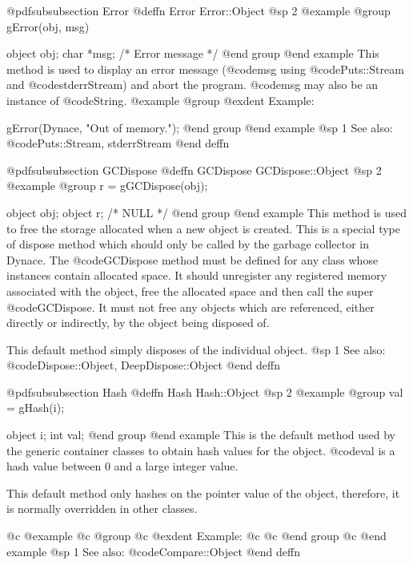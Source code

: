 @pdfsubsubsection {Error}
@deffn {Error} Error::Object
@sp 2
@example
@group
gError(obj, msg)

object  obj;
char    *msg;  /*  Error message  */
@end group
@end example
This method is used to display an error message (@code{msg} using
@code{Puts::Stream} and @code{stderrStream}) and abort the
program.  @code{msg} may also be an instance of @code{String}.
@example
@group
@exdent Example:

gError(Dynace, "Out of memory.\n");
@end group
@end example
@sp 1
See also:  @code{Puts::Stream, stderrStream}
@end deffn













@pdfsubsubsection {GCDispose}
@deffn {GCDispose} GCDispose::Object
@sp 2
@example
@group
r = gGCDispose(obj);

object  obj;
object  r;     /*  NULL  */
@end group
@end example
This method is used to free the storage allocated when a new object is
created.  This is a special type of dispose method which should only be
called by the garbage collector in Dynace.  The @code{GCDispose} method
must be defined for any class whose instances contain allocated space.
It should unregister any registered memory associated with the object,
free the allocated space and then call the super @code{GCDispose}.  It
must not free any objects which are referenced, either directly or
indirectly, by the object being disposed of.

This default method simply disposes of the individual object.
@sp 1
See also:  @code{Dispose::Object, DeepDispose::Object}
@end deffn





@pdfsubsubsection {Hash}
@deffn {Hash} Hash::Object
@sp 2
@example
@group
val = gHash(i);

object  i;
int     val;
@end group
@end example
This is the default method used by the generic container classes to
obtain hash values for the object.  @code{val} is a hash value between 0
and a large integer value.

This default method only hashes on the pointer value of the object,
therefore, it is normally overridden in other classes.

@c @example
@c @group
@c @exdent Example:
@c
@c @end group
@c @end example
@sp 1
See also:  @code{Compare::Object}
@end deffn









